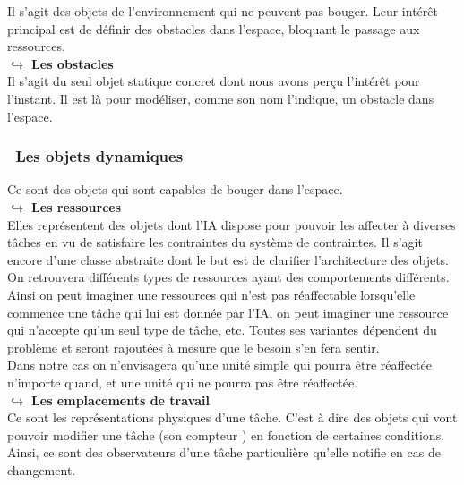 Il s'agit des objets de l'environnement qui ne peuvent pas bouger. Leur intérêt principal est de définir des obstacles dans l'espace, bloquant le passage aux ressources.\\

\textbf{$\hookrightarrow$ Les obstacles}\\

Il s'agit du seul objet statique concret dont nous avons perçu l’intérêt pour l'instant. Il est là pour modéliser, comme son nom l'indique, un obstacle dans l'espace.

\subsubsection*{\textbullet ~Les objets dynamiques}

Ce sont des objets qui sont capables de bouger dans l'espace.\\

\textbf{$\hookrightarrow$ Les ressources}\\

Elles représentent des objets dont l'IA dispose pour pouvoir les affecter à diverses tâches en vu de satisfaire les contraintes du système de contraintes. Il s'agit encore d'une classe abstraite dont le but est de clarifier l'architecture des objets. On retrouvera différents types de ressources ayant des comportements différents.\\

Ainsi on peut imaginer une ressources qui n'est pas réaffectable lorsqu'elle commence une tâche qui lui est donnée par l'IA, on peut imaginer une ressource qui n'accepte qu'un seul type de tâche, etc. Toutes ses variantes dépendent du problème et seront rajoutées à mesure que le besoin s'en fera sentir.\\
\indent Dans notre cas on n'envisagera qu'une unité simple qui pourra être réaffectée n'importe quand, et une unité qui ne pourra pas être réaffectée.\\

\textbf{$\hookrightarrow$ Les emplacements de travail}\\

Ce sont les représentations physiques d'une tâche. C'est à dire des objets qui vont pouvoir modifier une tâche (son \og compteur \fg ) en fonction de certaines conditions.\\
\indent Ainsi, ce sont des observateurs d'une tâche particulière qu'elle notifie en cas de changement.\\

